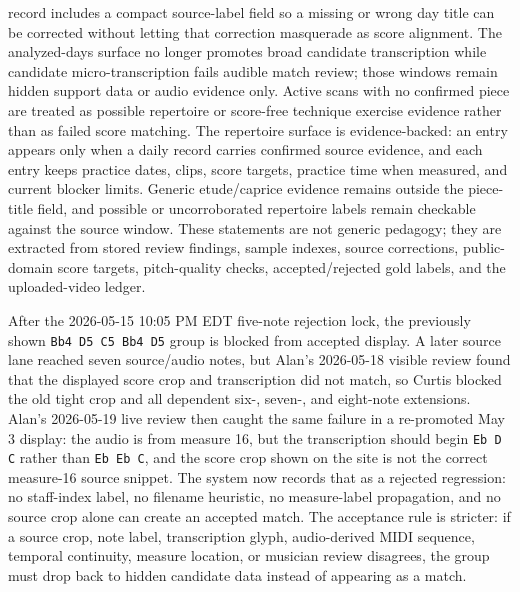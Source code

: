 \documentclass[12pt,letterpaper]{article}
\begin{document}
record includes a compact source-label field so a missing or wrong day title can be corrected without letting that correction masquerade as score alignment. The analyzed-days surface no longer promotes broad candidate transcription while candidate micro-transcription fails audible match review; those windows remain hidden support data or audio evidence only. Active scans with no confirmed piece are treated as possible repertoire or score-free technique exercise evidence rather than as failed score matching. The repertoire surface is evidence-backed: an entry appears only when a daily record carries confirmed source evidence, and each entry keeps practice dates, clips, score targets, practice time when measured, and current blocker limits. Generic etude/caprice evidence remains outside the piece-title field, and possible or uncorroborated repertoire labels remain checkable against the source window. These statements are not generic pedagogy; they are extracted from stored review findings, sample indexes, source corrections, public-domain score targets, pitch-quality checks, accepted/rejected gold labels, and the uploaded-video ledger.

After the 2026-05-15 10:05 PM EDT five-note rejection lock, the previously shown \texttt{Bb4 D5 C5 Bb4 D5} group is blocked from accepted display. A later source lane reached seven source/audio notes, but Alan's 2026-05-18 visible review found that the displayed score crop and transcription did not match, so Curtis blocked the old tight crop and all dependent six-, seven-, and eight-note extensions. Alan's 2026-05-19 live review then caught the same failure in a re-promoted May 3 display: the audio is from measure 16, but the transcription should begin \texttt{Eb D C} rather than \texttt{Eb Eb C}, and the score crop shown on the site is not the correct measure-16 source snippet. The system now records that as a rejected regression: no staff-index label, no filename heuristic, no measure-label propagation, and no source crop alone can create an accepted match. The acceptance rule is stricter: if a source crop, note label, transcription glyph, audio-derived MIDI sequence, temporal continuity, measure location, or musician review disagrees, the group must drop back to hidden candidate data instead of appearing as a match.
\end{document}
